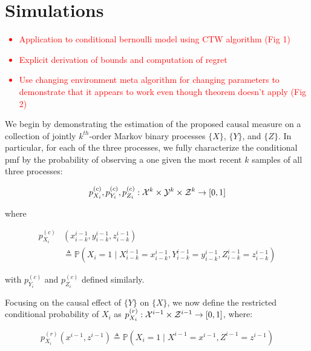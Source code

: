 \section{Simulations}

\textcolor{red}
{\begin{itemize}
    \item Application to conditional bernoulli model using CTW algorithm (Fig 1)
    \item Explicit derivation of bounds and computation of regret
    \item Use changing environment meta algorithm for changing parameters to demonstrate that it appears to work even though theorem doesn't apply (Fig 2)
\end{itemize}}

We begin by demonstrating the estimation of the proposed causal measure on a collection of jointly $k^{th}$-order Markov binary processes $\{X\}$, $\{Y\}$, and $\{Z\}$. In particular, for each of the three processes, we fully characterize the conditional pmf by the probability of observing a one given the most recent $k$ samples of all three processes:

\begin{equation}
p^{(c)}_{X_i},p^{(c)}_{Y_i},p^{(c)}_{Z_i} : \mathcal{X}^k \times \mathcal{Y}^k \times \mathcal{Z}^k \rightarrow [0,1]
\end{equation}

\noindent where

\begin{equation*}
\begin{aligned}
p^{(c)}_{X_i}&(x_{i-k}^{i-1},y_{i-k}^{i-1},z_{i-k}^{i-1}) \\
&\triangleq \mathbb{P}(X_i = 1 \mid X_{i-k}^{i-1} = x_{i-k}^{i-1},Y_{i-k}^{i-1} = y_{i-k}^{i-1},Z_{i-k}^{i-1} = z_{i-k}^{i-1})
\end{aligned}
\end{equation*}

\noindent with $p^{(c)}_{Y_i}$ and $p^{(c)}_{Z_i}$ defined similarly.

Focusing on the causal effect of $\{Y\}$ on $\{X\}$, we now define the restricted conditional probability of $X_i$ as $p_{X_i}^{(r)}:\mathcal{X}^{i-1} \times \mathcal{Z}^{i-1} \rightarrow [0,1]$, where:

\begin{equation*}
p^{(r)}_{X_i}(x^{i-1},z^{i-1})
\triangleq \mathbb{P}(X_i = 1 \mid X^{i-1} = x^{i-1},Z^{i-1} = z^{i-1})
\end{equation*}

